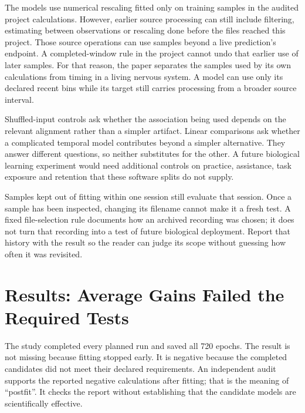 The models use numerical rescaling fitted only on training samples in the audited project calculations. However, earlier source processing can still include filtering, estimating between observations or rescaling done before the files reached this project. Those source operations can use samples beyond a live prediction's endpoint. A completed-window rule in the project cannot undo that earlier use of later samples. For that reason, the paper separates the samples used by its own calculations from timing in a living nervous system. A model can use only its declared recent bins while its target still carries processing from a broader source interval.

Shuffled-input controls ask whether the association being used depends on the relevant alignment rather than a simpler artifact. Linear comparisons ask whether a complicated temporal model contributes beyond a simpler alternative. They answer different questions, so neither substitutes for the other. A future biological learning experiment would need additional controls on practice, assistance, task exposure and retention that these software splits do not supply.

Samples kept out of fitting within one session still evaluate that session. Once a sample has been inspected, changing its filename cannot make it a fresh test. A fixed file-selection rule documents how an archived recording was chosen; it does not turn that recording into a test of future biological deployment. Report that history with the result so the reader can judge its scope without guessing how often it was revisited.

\section{Results: Average Gains Failed the Required Tests}

The study completed every planned run and saved all 720 epochs. The result is
not missing because fitting stopped early. It is negative because the completed
candidates did not meet their declared requirements. An independent audit supports
the reported negative calculations after fitting; that is the meaning of
``postfit''. It checks the report without establishing that the candidate models
are scientifically effective.

